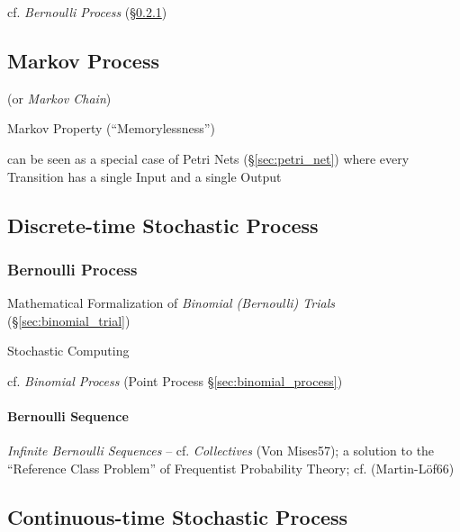 cf. \emph{Bernoulli Process} (\S\ref{sec:bernoulli_process})



\subsection{Markov Process}\label{sec:markov_process}

(or \emph{Markov Chain})

Markov Property (``Memorylessness'')

can be seen as a special case of Petri Nets (\S\ref{sec:petri_net})
where every Transition has a single Input and a single Output



\subsection{Discrete-time Stochastic Process}\label{sec:discretetime_stochastic}

\subsubsection{Bernoulli Process}\label{sec:bernoulli_process}

Mathematical Formalization of \emph{Binomial (Bernoulli) Trials}
(\S\ref{sec:binomial_trial})

Stochastic Computing

cf. \emph{Binomial Process} (Point Process \S\ref{sec:binomial_process})



\paragraph{Bernoulli Sequence}\label{sec:bernoulli_sequence}\hfill

\emph{Infinite Bernoulli Sequences} -- cf. \emph{Collectives} (Von Mises57); a
solution to the ``Reference Class Problem'' of Frequentist Probability Theory;
cf. (Martin-L\"of66)



\subsection{Continuous-time Stochastic Process}\label{sec:continuous_stochastic}


